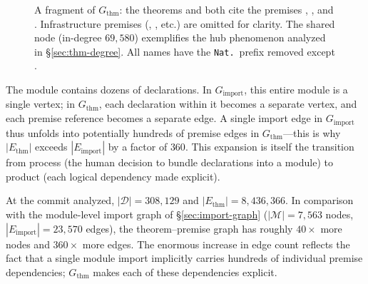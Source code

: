 \begin{figure}[H]
\centering
{}
\caption{A fragment of $G_{\mathrm{thm}}$: the theorems  and  both cite the premises , , and . Infrastructure premises (, , etc.) are omitted for clarity. The shared node  (in-degree $69{,}580$) exemplifies the hub phenomenon analyzed in \S\ref{sec:thm-degree}. All names have the \texttt{Nat.}\ prefix removed except .}
\label{fig:thm-fragment}
\end{figure}

\begin{remark}
The module  contains dozens of declarations. In $G_{\mathrm{import}}$, this entire module is a single vertex; in $G_{\mathrm{thm}}$, each declaration within it becomes a separate vertex, and each premise reference becomes a separate edge. A single import edge in $G_{\mathrm{import}}$ thus unfolds into potentially hundreds of premise edges in $G_{\mathrm{thm}}$---this is why $|E_{\mathrm{thm}}|$ exceeds $|E_{\mathrm{import}}|$ by a factor of $360$. This expansion is itself the transition from process (the human decision to bundle declarations into a module) to product (each logical dependency made explicit).
\end{remark}

At the commit analyzed, $|\mathcal{D}| = 308{,}129$ and $|E_{\mathrm{thm}}| = 8{,}436{,}366$. In comparison with the module-level import graph of \S\ref{sec:import-graph} ($|\mathcal{M}| = 7{,}563$ nodes, $|E_{\mathrm{import}}| = 23{,}570$ edges), the theorem--premise graph has roughly $40\times$ more nodes and $360\times$ more edges. The enormous increase in edge count reflects the fact that a single module import implicitly carries hundreds of individual premise dependencies; $G_{\mathrm{thm}}$ makes each of these dependencies explicit.

